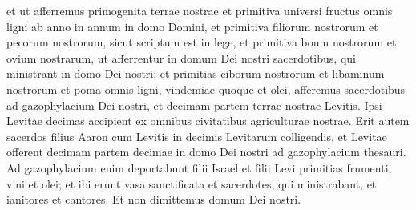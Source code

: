 \begin{biblechapter}
\verse et ut afferremus primogenita terrae nostrae et primitiva universi fructus omnis ligni ab anno in annum in domo Domini, 
\verse et primitiva filiorum nostrorum et pecorum nostrorum, sicut scriptum est in lege, et primitiva boum nostrorum et ovium nostrarum, ut afferrentur in domum Dei nostri sacerdotibus, qui ministrant in domo Dei nostri;  
\verse et primitias ciborum nostrorum et libaminum nostrorum et poma omnis ligni, vindemiae quoque et olei, afferemus sacerdotibus ad gazophylacium Dei nostri, et decimam partem terrae nostrae Levitis. Ipsi Levitae decimas accipient ex omnibus civitatibus agriculturae nostrae. 
\verse Erit autem sacerdos filius Aaron cum Levitis in decimis Levitarum colligendis, et Levitae offerent decimam partem decimae in domo Dei nostri ad gazophylacium thesauri. 
\verse Ad gazophylacium enim deportabunt filii Israel et filii Levi primitias frumenti, vini et olei; et ibi erunt vasa sanctificata et sacerdotes, qui ministrabant, et ianitores et cantores. Et non dimittemus domum Dei nostri. 
\end{biblechapter}

